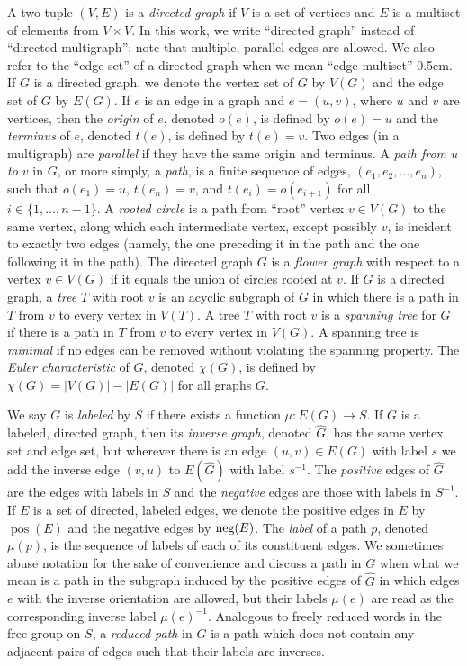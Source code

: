 \documentclass{article}
\DeclareMathOperator{\pos}{pos}
\newcommand{\nega}{\textnormal{neg}}
\begin{document}
A two-tuple $(V, E)$ is a \emph{directed graph} if $V$ is a set of vertices and $E$ is a multiset of elements from $V \times V$.
In this work, we write ``directed graph'' instead of ``directed multigraph''; note that multiple, parallel edges are allowed.
We also refer to the ``edge set'' of a directed graph when we mean ``edge multiset''\kern-0.5em.
If $G$ is a directed graph, we denote the vertex set of $G$ by $V(G)$ and the edge set of $G$ by $E(G)$.
If $e$ is an edge in a graph and $e = (u, v)$, where $u$ and $v$ are vertices, then the \emph{origin} of $e$, denoted $o(e)$, is defined by $o(e) = u$ and the \emph{terminus} of $e$, denoted $t(e)$, is defined by $t(e) = v$.
Two edges (in a multigraph) are \emph{parallel} if they have the same origin and terminus.
A \emph{path from $u$ to $v$} in $G$, or more simply, a \emph{path}, is a finite sequence of edges, $(e_1, e_2, \dotsc, e_n)$, such that $o(e_1) = u$, $t(e_n) = v$, and $t(e_i) = o(e_{i + 1})$ for all $i \in \{1, \dotsc, n - 1\}$.
A \emph{rooted circle} is a path from ``root'' vertex $v \in V(G)$ to the same vertex, along which each intermediate vertex, except possibly $v$, is incident to exactly two edges (namely, the one preceding it in the path and the one following it in the path).
The directed graph $G$ is a \emph{flower graph} with respect to a vertex $v \in V(G)$ if it equals the union of circles rooted at $v$.
If $G$ is a directed graph, a \emph{tree} $T$ with root $v$ is an acyclic subgraph of $G$ in which there is a path in $T$ from $v$ to every vertex in $V(T)$.
A tree $T$ with root $v$ is a \emph{spanning tree} for $G$ if there is a path in $T$ from $v$ to every vertex in $V(G)$.
A spanning tree is \emph{minimal} if no edges can be removed without violating the spanning property.
The \emph{Euler characteristic} of $G$, denoted $\chi(G)$, is defined by $\chi(G) = |V(G)| - |E(G)|$ for all graphs $G$.

We say $G$ is \emph{labeled} by $S$ if there exists a function $\mu \colon E(G) \to S$.
If $G$ is a labeled, directed graph, then its \emph{inverse graph}, denoted $\hat{G}$, has the same vertex set and edge set, but wherever there is an edge $(u, v) \in E(G)$ with label $s$ we add the inverse edge $(v, u)$ to $E(\hat{G})$ with label $s^{-1}$.
The \emph{positive} edges of $\hat{G}$ are the edges with labels in $S$ and the \emph{negative} edges are those with labels in $S^{-1}$.
If $E$ is a set of directed, labeled edges, we denote the positive edges in $E$ by $\pos(E)$ and the negative edges by $\nega(E)$.
The \emph{label} of a path $p$, denoted $\mu(p)$, is the sequence of labels of each of its constituent edges.
We sometimes abuse notation for the sake of convenience and discuss a path in $G$ when what we mean is a path in the subgraph induced by the positive edges of $\hat{G}$ in which edges $e$ with the inverse orientation are allowed, but their labels $\mu(e)$ are read as the corresponding inverse label $\mu(e)^{-1}$.
Analogous to freely reduced words in the free group on $S$, a \emph{reduced path} in $G$ is a path which does not contain any adjacent pairs of edges such that their labels are inverses.
\end{document}
